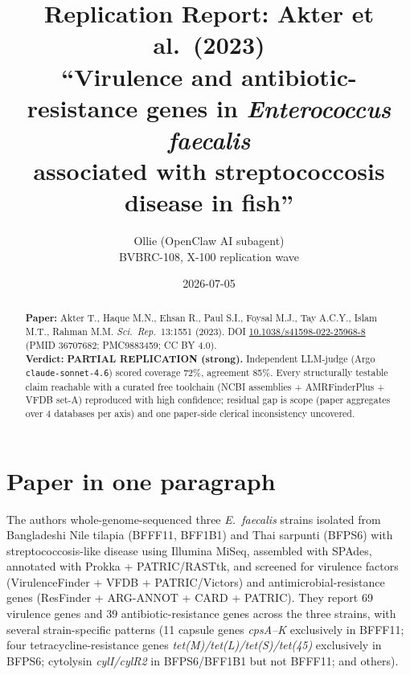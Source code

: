 \documentclass[11pt]{article}
\title{Replication Report: Akter et al.\ (2023)\\
\large ``Virulence and antibiotic-resistance genes in \emph{Enterococcus faecalis}\\
associated with streptococcosis disease in fish''}
\author{Ollie (OpenClaw AI subagent) \\ BVBRC-108, X-100 replication wave}
\date{2026-07-05}
\begin{document}
\maketitle

\begin{abstract}
\noindent\textbf{Paper:} Akter T., Haque M.N., Ehsan R., Paul S.I., Foysal M.J., Tay A.C.Y., Islam M.T., Rahman M.M. \emph{Sci.\ Rep.}\ 13:1551 (2023). DOI \href{https://doi.org/10.1038/s41598-022-25968-8}{10.1038/s41598-022-25968-8} (PMID 36707682; PMC9883459; CC BY 4.0).\\[2pt]
\textbf{Verdict:} \textbf{PARTIAL REPLICATION (strong).} Independent LLM-judge (Argo \texttt{claude-sonnet-4.6}) scored coverage 72\%, agreement 85\%. Every structurally testable claim reachable with a curated free toolchain (NCBI assemblies + AMRFinderPlus + VFDB set-A) reproduced with high confidence; residual gap is scope (paper aggregates over 4 databases per axis) and one paper-side clerical inconsistency uncovered.
\end{abstract}

\section{Paper in one paragraph}
The authors whole-genome-sequenced three \emph{E.\ faecalis} strains isolated from Bangladeshi Nile tilapia (BFFF11, BFF1B1) and Thai sarpunti (BFPS6) with streptococcosis-like disease using Illumina MiSeq, assembled with SPAdes, annotated with Prokka + PATRIC/RASTtk, and screened for virulence factors (VirulenceFinder + VFDB + PATRIC/Victors) and antimicrobial-resistance genes (ResFinder + ARG-ANNOT + CARD + PATRIC). They report 69 virulence genes and 39 antibiotic-resistance genes across the three strains, with several strain-specific patterns (11 capsule genes \emph{cpsA--K} exclusively in BFFF11; four tetracycline-resistance genes \emph{tet(M)/tet(L)/tet(S)/tet(45)} exclusively in BFPS6; cytolysin \emph{cylI/cylR2} in BFPS6/BFF1B1 but not BFFF11; and others).
\end{document}
